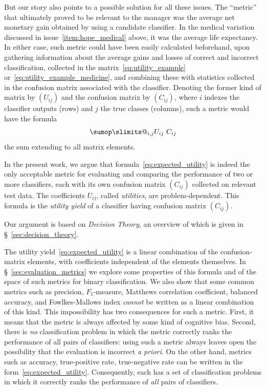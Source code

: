 \documentclass[\ifafour a4paper,12pt,\else a5paper,10pt,\fi%
onecolumn,oneside,article,%
british%
]{memoir}
\makeatletter
\theoremstyle{remark}
\theoremstyle{innote}
\def\sum{\DOTSI\sumop\slimits@}
\renewcommand*{\|}[1][]{\nonscript\:#1\vert\nonscript\:\mathopen{}}
\newcommand*{\sect}{\S}%
\makeatother
\begin{document}
\bigskip

But our story also points to a possible solution for all these issues. The \enquote{metric} that ultimately proved to be relevant to the manager was the average net monetary gain obtained by using a candidate classifier. In the medical variation discussed in issue~\ref{item:hope_medical} above, it was the average life expectancy. In either case, such metric could have been easily calculated beforehand, upon gathering information about the average gains and losses of correct and incorrect classification, collected in the matrix~\eqref{eq:utility_example} or~\eqref{eq:utility_example_medicine}, and combining these with statistics collected in the confusion matrix associated with the classifier. Denoting the former kind of matrix by $(U_{ij})$ and the confusion matrix by $(C_{ij})$, where $i$ indexes the classifier outputs (rows) and $j$ the true classes (columns), such a metric would have the formula
\begin{equation}
  \label{eq:expected_utility}
  \sum_{i,j} U_{ij}\ C_{ij} 
\end{equation}
the sum extending to all matrix elements.

\medskip

In the present work, we argue that formula~\eqref{eq:expected_utility} is indeed the only acceptable metric for evaluating and comparing the performance of two or more classifiers, each with its own confusion matrix $(C_{ij})$ collected on relevant test data. The coefficients $U_{ij}$, called \emph{utilities}, are problem-dependent. This formula is the \emph{utility yield} of a classifier having confusion matrix $(C_{ij})$.

Our argument is based on \emph{Decision Theory}, an overview of which is given in \sect~\ref{sec:decision_theory}.

The utility yield~\eqref{eq:expected_utility} is a linear combination of the confusion-matrix elements, with coefficients independent of the elements themselves. In \sect~\ref{sec:evaluation_metrics} we explore some properties of this formula and of the space of such metrics for binary classification. We also show that some common metrics such as precision, $F_{1}$-measure, Matthews correlation coefficient, balanced accuracy, and Fowlkes-Mallows index \emph{cannot} be written as a linear combination of this kind. This impossibility has two consequences for such a metric. First, it means that the metric is always affected by some kind of cognitive bias. Second, there is \emph{no} classification problem in which the metric correctly ranks the performance of all pairs of classifiers: using such a metric always leaves open the possibility that the evaluation is incorrect \emph{a priori}. On the other hand, metrics such as accuracy, true-positive rate, true-negative rate can be written in the form~\eqref{eq:expected_utility}. Consequently, each has a set of classification problems in which it correctly ranks the performance of \emph{all} pairs of classifiers.
\end{document}
